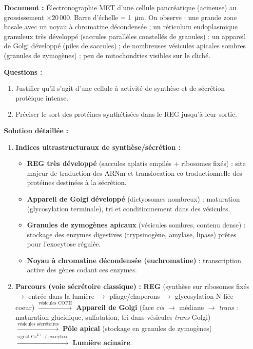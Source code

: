 \documentclass[11pt]{article}
\begin{document}
\begin{exoresolu}
\textbf{Document :} Électronographie MET d'une cellule pancréatique (acineuse) au grossissement $\times 20\,000$. Barre d'échelle = \SI{1}{\micro\meter}. On observe : une grande zone basale avec un noyau à chromatine décondensée ; un réticulum endoplasmique granuleux très développé (saccules parallèles constellés de granules) ; un appareil de Golgi développé (piles de saccules) ; de nombreuses vésicules apicales sombres (granules de zymogènes) ; peu de mitochondries visibles sur le cliché.

\textbf{Questions :}
\begin{enumerate}
    \item Justifier qu'il s'agit d'une cellule à activité de synthèse et de sécrétion protéique intense.
    \item Préciser le sort des protéines synthétisées dans le REG jusqu'à leur sortie.
\end{enumerate}

\tcblower
\textbf{Solution détaillée :}
\begin{enumerate}
    \item \textbf{Indices ultrastructuraux de synthèse/sécrétion :}
    \begin{itemize}
        \item \textbf{REG très développé} (saccules aplatis empilés + ribosomes fixés) : site majeur de traduction des ARNm et translocation co-traductionnelle des protéines destinées à la sécrétion.
        \item \textbf{Appareil de Golgi développé} (dictyosomes nombreux) : maturation (glycosylation terminale), tri et conditionnement dans des vésicules.
        \item \textbf{Granules de zymogènes apicaux} (vésicules sombres, contenu dense) : stockage des enzymes digestives (trypsinogène, amylase, lipase) prêtes pour l'exocytose régulée.
        \item \textbf{Noyau à chromatine décondensée (euchromatine)} : transcription active des gènes codant ces enzymes.
    \end{itemize}
    \item \textbf{Parcours (voie sécrétoire classique) :}
    \textbf{REG} (synthèse sur ribosomes fixés $\to$ entrée dans la lumière $\to$ pliage/chaperons $\to$ glycosylation N-liée coeur) 
    $\xrightarrow{\text{vésicules COPII}}$ 
    \textbf{Appareil de Golgi} (face \emph{cis} $\to$ médiane $\to$ \emph{trans} : maturation glucidique, sulfatation, tri dans vésicules \emph{trans}-Golgi) 
    $\xrightarrow{\text{vésicules sécrétoires}}$ 
    \textbf{Pôle apical} (stockage en granules de zymogènes) 
    $\xrightarrow{\text{signal Ca}^{2+}\text{ / exocytose}}$ 
    \textbf{Lumière acinaire}.
\end{enumerate}
\end{exoresolu}
\end{document}
